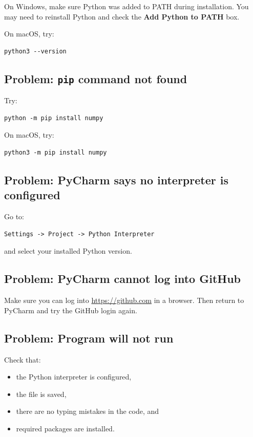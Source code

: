 \documentclass[11pt]{article}
\begin{document}
On Windows, make sure Python was added to PATH during installation. You may need to reinstall Python and check the \textbf{Add Python to PATH} box.

On macOS, try:

\begin{lstlisting}[style=terminal]
python3 --version
\end{lstlisting}

\subsection*{Problem: \texttt{pip} command not found}

Try:

\begin{lstlisting}[style=terminal]
python -m pip install numpy
\end{lstlisting}

On macOS, try:

\begin{lstlisting}[style=terminal]
python3 -m pip install numpy
\end{lstlisting}

\subsection*{Problem: PyCharm says no interpreter is configured}

Go to:

\begin{lstlisting}[style=terminal]
Settings -> Project -> Python Interpreter
\end{lstlisting}

and select your installed Python version.

\subsection*{Problem: PyCharm cannot log into GitHub}

Make sure you can log into \url{https://github.com} in a browser. Then return to PyCharm and try the GitHub login again.

\subsection*{Problem: Program will not run}

Check that:

\begin{itemize}
    \item the Python interpreter is configured,
    \item the file is saved,
    \item there are no typing mistakes in the code, and
    \item required packages are installed.
\end{itemize}
\end{document}
